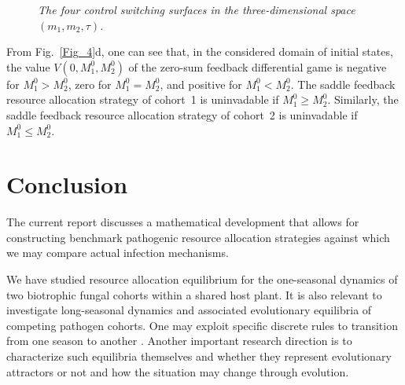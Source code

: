 \documentclass[11pt]{amsart}
\begin{document}
\begin{figure}
\bf \caption{\it The four control switching surfaces in the three-dimensional
space~$ (m_1, m_2, \tau) $.}
\label{Fig_7}
\end{figure}

From Fig.~{\rm \ref{Fig_4}d,} one can see that{\rm ,} in the considered domain
of initial states{\rm ,} the value $ V \left( 0, M_1^0, M_2^0 \right) $ of
the zero-sum feedback differential game is negative for $ M_1^0 > M_2^0 ${\rm ,}
zero for $ M_1^0 = M_2^0 ${\rm ,} and positive for $ M_1^0 < M_2^0 $. The
saddle feedback resource allocation strategy of cohort~{\rm 1} is uninvadable
if $ M_1^0 \geqslant M_2^0 $. Similarly{\rm ,} the saddle feedback resource
allocation strategy of cohort~{\rm 2} is uninvadable if $ M_1^0
\leqslant M_2^0 $.


\section{Conclusion}

The current report discusses a mathematical development that allows for constructing 
benchmark pathogenic resource allocation strategies %
against which
we may compare actual infection mechanisms.

We have studied resource allocation equilibrium for the one-seasonal dynamics
of two biotrophic fungal cohorts within a shared host plant. It is also relevant
to investigate 
long-seasonal dynamics %
and 
associated evolutionary equilibria %
of
competing pathogen cohorts. One may exploit specific discrete rules to
transition from one season to another \cite{MailleretLemesle2009,Akhmetzhanov2012}.
Another important research direction is to characterize such equilibria
themselves and whether they represent evolutionary attractors or not and how the
situation may change through evolution.
\end{document}
